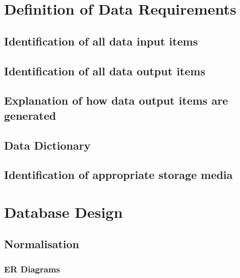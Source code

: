 \section{Definition of Data Requirements}

\subsection{Identification of all data input items}

\subsection{Identification of all data output items}

\subsection{Explanation of how data output items are generated}

\subsection{Data Dictionary}

\subsection{Identification of appropriate storage media}

\section{Database Design}

\subsection{Normalisation}

\pagebreak
\subsubsection{ER Diagrams}

